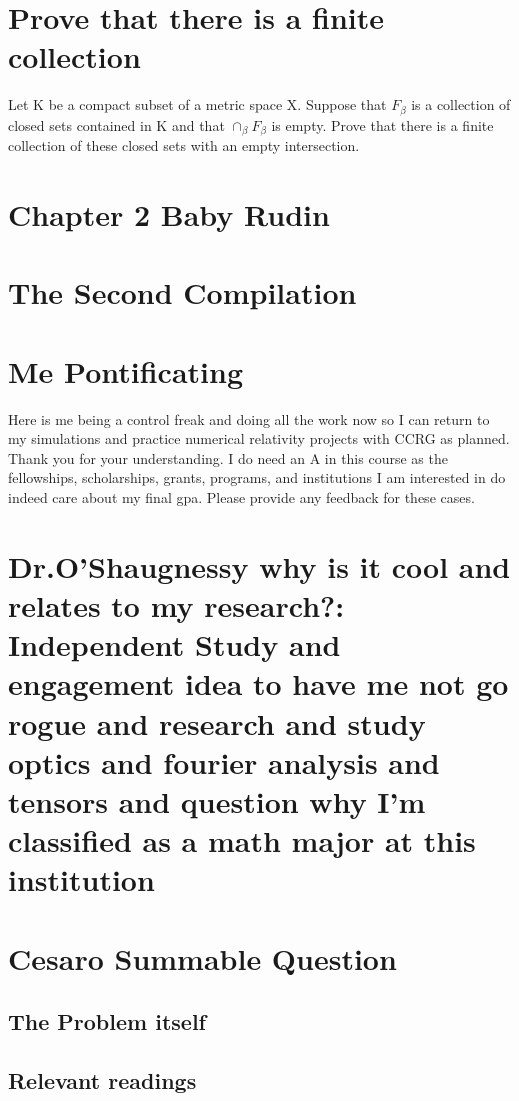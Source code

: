 \section{Prove that there is a finite collection}
Let K be a compact subset of a metric space X. Suppose that $F_{\beta}$ is a collection of closed sets contained in K and that $\cap_{\beta} F_{\beta}$ is empty. Prove that there is a finite collection of these closed sets with an empty intersection. 



\section{Chapter 2 Baby Rudin}

\section{The Second Compilation}
\section*{Me Pontificating}
Here is me being a control freak and doing all the work now so I can return to my simulations and practice numerical relativity projects with CCRG as planned. Thank you for your understanding. I do need an A in this course as the fellowships, scholarships, grants, programs, and institutions I am interested in do indeed care about my final gpa. Please provide any feedback for these cases. \\ 

\section*{Dr.O'Shaugnessy why is it cool and relates to my research?: Independent Study and engagement idea to have me not go rogue and research and study optics and fourier analysis and tensors and question why I'm classified as a math major at this institution}

\section{Cesaro Summable Question }

\subsection{The Problem itself}


\subsection{Relevant readings}


